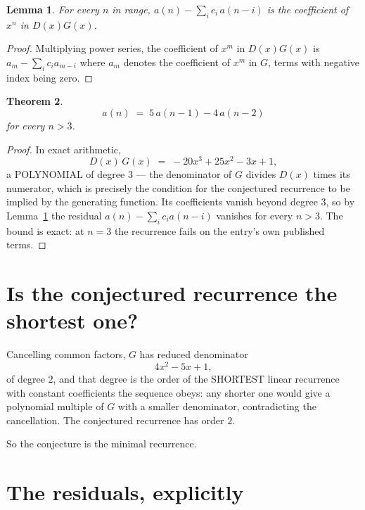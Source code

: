 \documentclass[11pt,a4paper]{article}
\theoremstyle{plain}
\newtheorem{theorem}{Theorem}
\newtheorem{lemma}[theorem]{Lemma}
\theoremstyle{definition}
\begin{document}
\begin{lemma}\label{lem:key}
For every $n$ in range, $a(n)-\sum_i c_i\,a(n-i)$ is the coefficient of $x^{n}$ in
$D(x)G(x)$.
\end{lemma}

\begin{proof}
Multiplying power series, the coefficient of $x^{m}$ in $D(x)G(x)$ is
$a_m-\sum_i c_i a_{m-i}$ where $a_m$ denotes the coefficient of $x^{m}$ in $G$, terms with
negative index being zero.
\end{proof}

\begin{theorem}
\[
a(n)\;=\;5\,a(n-1) - 4\,a(n-2)
\]
for every $n>3$.
\end{theorem}

\begin{proof}
In exact arithmetic,
\[
D(x)\,G(x)\;=\;- 20 x^{3} + 25 x^{2} - 3 x + 1,
\]
a POLYNOMIAL of degree $3$ --- the denominator of $G$ divides $D(x)$ times its numerator,
which is precisely the condition for the conjectured recurrence to be implied by the
generating function. Its coefficients vanish beyond degree $3$, so by
Lemma~\ref{lem:key} the residual $a(n)-\sum_ic_ia(n-i)$ vanishes for every
$n>3$. The bound is exact: at $n=3$ the recurrence fails on the entry's own published terms.
\end{proof}

\section{Is the conjectured recurrence the shortest one?}

Cancelling common factors, $G$ has reduced denominator
\[
4 x^{2} - 5 x + 1,
\]
of degree $2$, and that degree is the order of the SHORTEST linear recurrence with
constant coefficients the sequence obeys: any shorter one would give a polynomial multiple of
$G$ with a smaller denominator, contradicting the cancellation. The conjectured recurrence has
order $2$.

So the conjecture is the minimal recurrence.

\section{The residuals, explicitly}
\end{document}
